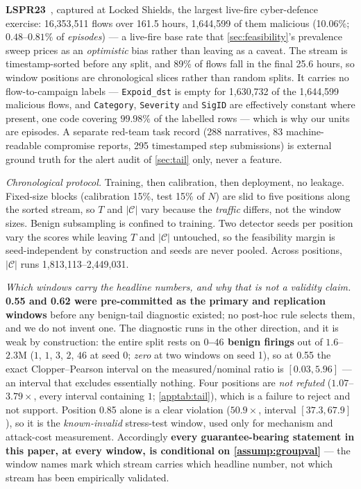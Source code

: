 \documentclass[conference]{IEEEtran}
\newcommand{\Cal}{\mathcal{C}}
\newcommand{\nCal}{\lvert\Cal\rvert}
\begin{document}
\textbf{LSPR23}~\cite{lspr23}, captured at Locked Shields, the largest live-fire cyber-defence
exercise: 16,353,511 flows over 161.5 hours, 1,644,599 of them malicious (10.06\%; $0.48$--$0.81\%$
of \emph{episodes}) --- a live-fire base rate that \cref{sec:feasibility}'s prevalence sweep prices as
an \emph{optimistic} bias rather than leaving as a caveat. The stream is
timestamp-sorted before any split, and 89\% of flows fall in the final 25.6 hours, so window
positions are chronological slices rather than random splits. It carries no
flow-to-campaign labels --- \texttt{Expoid\_dst} is empty for 1,630,732 of the 1,644,599 malicious
flows, and \texttt{Category}, \texttt{Severity} and \texttt{SigID} are effectively constant where
present, one code covering $99.98\%$ of the labelled rows --- which is why our units are episodes. A separate red-team task record (288
narratives, 83 machine-readable compromise reports, 295 timestamped step submissions) is external
ground truth for the alert audit of \cref{sec:tail} only, never a feature.

\emph{Chronological protocol.} Training, then calibration, then deployment, no leakage. Fixed-size blocks (calibration
15\%, test 15\% of $N$) are slid to five positions along the sorted stream, so $T$ and $\nCal$
vary because the \emph{traffic} differs, not the window sizes. Benign subsampling is
confined to training. Two detector seeds per position vary the scores while leaving $T$ and $\nCal$
untouched, so the feasibility margin is seed-independent by construction and seeds are never pooled.
Across positions, $\nCal$ runs 1,813,113--2,449,031.

\emph{Which windows carry the headline numbers, and why that is not a validity claim.} \textbf{0.55 and
0.62 were pre-committed as the primary and replication windows} before any benign-tail diagnostic
existed; no post-hoc rule selects them, and we do not invent one. The diagnostic runs in the other
direction, and it is weak by construction: the entire split rests on \textbf{$0$--$46$ benign
firings} out of $1.6$--$2.3$M ($1$, $1$, $3$, $2$, $46$ at seed 0; \emph{zero} at two windows on
seed 1), so at 0.55 the exact Clopper--Pearson interval on the measured/nominal ratio is
$[0.03, 5.96]$ --- an interval that excludes essentially nothing. Four
positions are \emph{not refuted} ($1.07$--$3.79\times$, every interval containing $1$;
\cref{apptab:tail}), which is a failure to reject and not support. Position 0.85 alone is a clear
violation ($50.9\times$, interval $[37.3, 67.9]$), so it is the \emph{known-invalid} stress-test
window, used only for mechanism and attack-cost measurement. Accordingly \textbf{every
guarantee-bearing statement in this paper, at every window, is conditional on \cref{assump:groupval}}
--- the window names mark which stream carries which headline number, not which stream has been
empirically validated.
\end{document}
